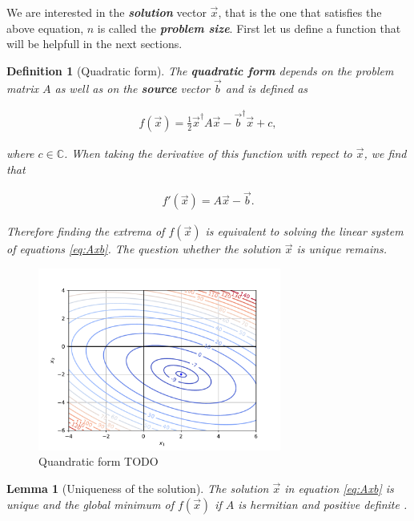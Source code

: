 \documentclass{article}
\theoremstyle{plain} %
\newtheorem{lemma}[theorem]{Lemma}
\newtheorem{definition}{Definition}[section]
\theoremstyle{remark} %
\def\df#1{\textbf{\textit{#1}}}
\numberwithin{equation}{section}
\begin{document}
We are interested in the \df{solution} vector $\vec{x}$, that is the one that satisfies the above equation, $n$ is called the \df{problem size}. First let us define a function that will be helpfull in the next sections.

\begin{definition}[Quadratic form]

The \df{quadratic form} depends on the problem matrix $A$ as well as on the \df{source} vector $\vec{b}$ and is defined as

\begin{align*}
    f(\vec{x}) = \frac{1}{2} \vec{x}^{\dagger} A \vec{x} - \vec{b}^{\dagger} \vec{x} + c,
\end{align*}

where $c \in \mathbb{C}$. When taking the derivative of this function with repect to $\vec{x}$, we find that

\begin{align*}
    f'(\vec{x}) = A \vec{x} - \vec{b}.
\end{align*}

Therefore finding the extrema of $f(\vec{x})$ is equivalent to solving the linear system of equations \eqref{eq:Axb}. The question whether the solution $\vec{x}$ is unique remains.

\end{definition}

\begin{figure}
    \centering
    \includegraphics[width=8cm]{plots/qform_contour}
    \caption{Quandratic form TODO}
    \label{fig:qform}
\end{figure}

\begin{lemma}[Uniqueness of the solution]
The solution $\vec{x}$ in equation \eqref{eq:Axb} is unique and the global minimum of $f(\vec{x})$ if $A$ is hermitian and positive definite \footnotemark.
\end{lemma}
\end{document}
